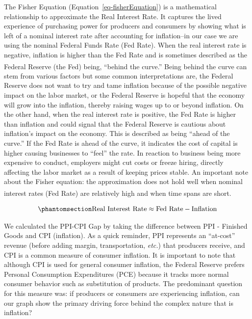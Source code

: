 \documentclass[10pt, letterpaper]{article}
\begin{document}
The Fisher Equation (Equation~\ref{eq-fisherEquation}) is a mathematical
relationship to approximate the Real Interest Rate. It captures the
lived experience of purchasing power for producers and consumers by
showing what is left of a nominal interest rate after accounting for
inflation--in our case we are using the nominal Federal Funds Rate (Fed
Rate). When the real interest rate is negative, inflation is higher than
the Fed Rate and is sometimes described as the Federal Reserve (the Fed)
being, ``behind the
curve.''\textsuperscript{}
Being behind the curve can stem from various factors but some common
interpretations are, the Federal Reserve does not want to try and tame
inflation because of the possible negative impact on the labor market,
or the Federal Reserve is hopeful that the economy will grow into the
inflation, thereby raising wages up to or beyond inflation. On the other
hand, when the real interest rate is positive, the Fed Rate is higher
than inflation and could signal that the Federal Reserve is cautious
about inflation's impact on the economy. This is described as being
``ahead of the curve.'' If the Fed Rate is ahead of the curve, it
indicates the cost of capital is higher causing businesses to ``feel''
the rate. In reaction to business being more expensive to conduct,
employers might cut costs or freeze hiring, directly affecting the labor
market as a result of keeping prices stable. An important note about the
Fisher equation: the approximation does not hold well when nominal
interest rates (Fed Rate) are relatively high and when time spans are
short.\textsuperscript{}

\begin{equation}\phantomsection\label{eq-fisherEquation}{
\text{Real Interest Rate} \approx \text{Fed Rate} - \text{Inflation}
}\end{equation}

We calculated the PPI-CPI Gap by taking the difference between PPI -
Finished Goods and CPI (inflation). As a quick reminder, PPI represents
an ``at-cost'' revenue (before adding margin, transportation,
\emph{etc.}) that producers receive, and CPI is a common measure of
consumer inflation. It is important to note that although CPI is used
for general consumer inflation, the Federal Reserve prefers Personal
Consumption Expenditures (PCE) because it tracks more normal consumer
behavior such as substitution of products. The predominant question for
this measure was: if producers or consumers are experiencing inflation,
can our graph show the primary driving force behind the complex nature
that is inflation?
\end{document}
